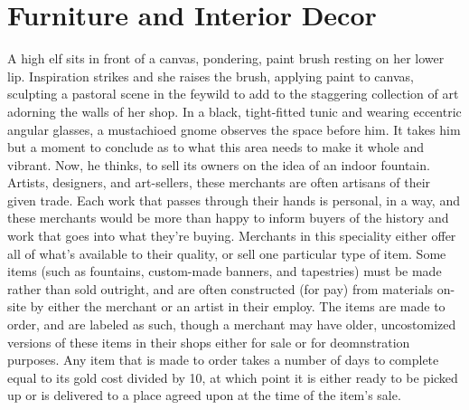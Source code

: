 \documentclass[10pt,a4paper,twoside,twocolumn,openany,nodeprecatedcode,bg=print]{dndbook}
\begin{document}
\section{Furniture and Interior Decor}
A high elf sits in front of a canvas, pondering, paint brush resting on her lower lip. Inspiration strikes and she raises the brush, applying paint to canvas, sculpting a pastoral scene in the feywild to add to the staggering collection of art adorning the walls of her shop.
In a black, tight-fitted tunic and wearing eccentric angular glasses, a mustachioed gnome observes the space before him. It takes him but a moment to conclude as to what this area needs to make it whole and vibrant. Now, he thinks, to sell its owners on the idea of an indoor fountain.
Artists, designers, and art-sellers, these merchants are often artisans of their given trade. Each work that passes through their hands is personal, in a way, and these merchants would be more than happy to inform buyers of the history and work that goes into what they're buying.
Merchants in this speciality either offer all of what's available to their quality, or sell one particular type of item. Some items (such as fountains, custom-made banners, and tapestries) must be made rather than sold outright, and are often constructed (for pay) from materials on-site by either the merchant or an artist in their employ. The items are made to order, and are labeled as such, though a merchant may have older, uncostomized versions of these items in their shops either for sale or for deomnstration purposes. Any item that is made to order takes a number of days to complete equal to its gold cost divided by 10, at which point it is either ready to be picked up or is delivered to a place agreed upon at the time of the item's sale.
\end{document}
